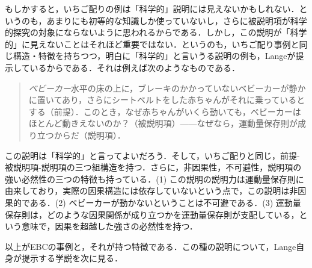 \documentclass[dvipdfmx,twoside,11pt,uplatex]{jsarticle}
\theoremstyle{definition}
\begin{document}
もしかすると，いちご配りの例は「科学的」説明には見えないかもしれない．というのも，あまりにも初等的な知識しか使っていないし，さらに被説明項が科学的探究の対象にならないように思われるからである．しかし，この説明が「科学的」に見えないことはそれほど重要ではない．というのも，いちご配り事例と同じ構造・特徴を持ちつつ，明白に「科学的」と言いうる説明の例も，Langeが提示しているからである．それは例えば次のようなものである．
\begin{quote}
    \emph{ベビーカー}\quad 水平の床の上に，ブレーキのかかっていないベビーカーが静かに置いてあり，さらにシートベルトをした赤ちゃんがそれに乗っているとする（前提）．このとき，なぜ赤ちゃんがいくら動いても，ベビーカーはほとんど動きえないのか？（被説明項）------なぜなら，運動量保存則が成り立つからだ（説明項）．
\end{quote}
この説明は「科学的」と言ってよいだろう．そして，いちご配りと同じ，前提-被説明項-説明項の三つ組構造を持つ．さらに，非因果性，不可避性，説明項の強い必然性の三つの特徴も持っている．(1) この説明の説明力は運動量保存則に由来しており，実際の因果構造には依存していないという点で，この説明は非因果的である．(2) ベビーカーが動かないということは不可避である．(3) 運動量保存則は，どのような因果関係が成り立つかを運動量保存則が支配している，という意味で，因果を超越した強さの必然性を持つ．

以上がEBCの事例と，それが持つ特徴である．この種の説明について，Lange自身が提示する学説を次に見る．

\end{document}
